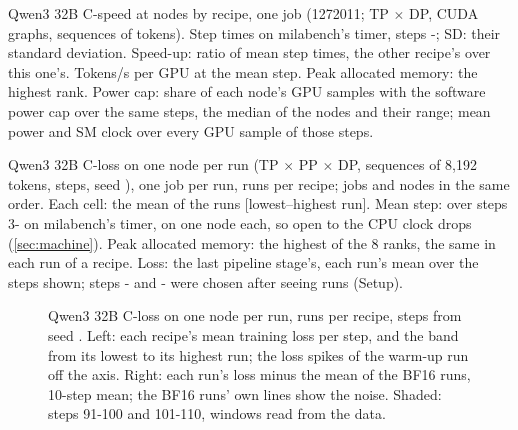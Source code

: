 \begin{table}[h]
  \caption{Qwen3 32B C-speed at \TriQwFpFourNodes{} nodes by recipe, one job (1272011; TP\TriQwFpFourTp{} $\times$ DP\TriQwFpFourDp, CUDA graphs, \TriQwFpFourSeqs{} sequences of \TriQwFpFourSeqLen{} tokens). Step times on milabench's timer, steps \TriQwFpFourFrom-\TriQwFpFourSteps; SD: their standard deviation. Speed-up: ratio of mean step times, the other recipe's over this one's. Tokens/s per GPU at the mean step. Peak allocated memory: the highest rank. Power cap: share of each node's GPU samples with the software power cap over the same steps, the median of the \TriQwFpFourNodes{} nodes and their range; mean power and SM clock over every GPU sample of those steps.}
  \label{tab:qw_fp4_speed}
  \centering\small
  \begin{adjustbox}{max width=\linewidth}
  \end{adjustbox}
\end{table}

\begin{table}[h]
  \caption{Qwen3 32B C-loss on one node per run (TP\TriQwFpFourLTp{} $\times$ PP\TriQwFpFourLPp{} $\times$ DP\TriQwFpFourLDp, \TriQwFpFourLSeqs{} sequences of 8,192 tokens, \TriQwFpFourLSteps{} steps, seed \TriQwFpFourLSeed), one job per run, \TriQwFpFourLRuns{} runs per recipe; jobs and nodes in the same order. Each cell: the mean of the runs [lowest--highest run]. Mean step: over steps 3-\TriQwFpFourLSteps{} on milabench's timer, on one node each, so open to the CPU clock drops (\cref{sec:machine}). Peak allocated memory: the highest of the 8 ranks, the same in each run of a recipe. Loss: the last pipeline stage's, each run's mean over the steps shown; steps \TriQwFpFourWinEarlyFrom-\TriQwFpFourWinEarlyTo{} and \TriQwFpFourWinMidFrom-\TriQwFpFourWinMidTo{} were chosen after seeing runs (Setup).}
  \label{tab:qw_fp4_loss}
  \centering\small
  \begin{adjustbox}{max width=\linewidth}
  \end{adjustbox}
\end{table}

\begin{figure}[h]
  \centering{}
  \caption{Qwen3 32B C-loss on one node per run, \TriQwFpFourLRuns{} runs per recipe, \TriQwFpFourLSteps{} steps from seed \TriQwFpFourLSeed. Left: each recipe's mean training loss per step, and the band from its lowest to its highest run; the loss spikes of the warm-up run off the axis. Right: each run's loss minus the mean of the BF16 runs, 10-step mean; the BF16 runs' own lines show the noise. Shaded: steps 91-100 and 101-110, windows read from the data.}
  \label{fig:qw_fp4_loss}
\end{figure}


